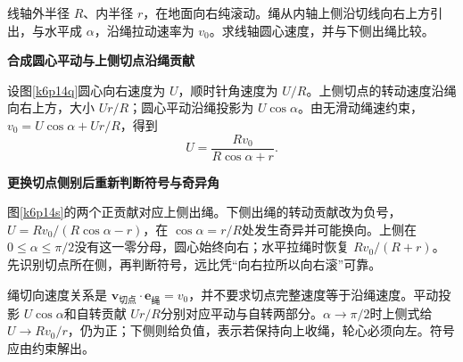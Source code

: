 \begin{question}\begin{example}[斜绳牵引上侧出绳线轴]\label{k6p14}
线轴外半径 $R$、内半径 $r$，在地面向右纯滚动。绳从内轴上侧沿切线向右上方引出，与水平成 $\alpha$，沿绳拉动速率为 $v_0$。求线轴圆心速度，并与下侧出绳比较。\end{example}
\end{question}
\begin{solution}\textbf{合成圆心平动与上侧切点沿绳贡献}\par\nobreak
设图\ref{k6p14q}圆心向右速度为 $U$，顺时针角速度为 $U/R$。上侧切点的转动速度沿绳向右上方，大小 $Ur/R$；圆心平动沿绳投影为 $U\cos\alpha$。由无滑动绳速约束，$v_0=U\cos\alpha+Ur/R$，得到
\[\boxed{U=\frac{Rv_0}{R\cos\alpha+r}}.\]



\par\medskip{}\noindent\textbf{更换切点侧别后重新判断符号与奇异角}\par\nobreak
图\ref{k6p14s}的两个正贡献对应上侧出绳。下侧出绳的转动贡献改为负号，$U=Rv_0/(R\cos\alpha-r)$，在 $\cos\alpha=r/R$处发生奇异并可能换向。上侧在 $0\le\alpha\le\pi/2$没有这一零分母，圆心始终向右；水平拉绳时恢复 $Rv_0/(R+r)$。先识别切点所在侧，再判断符号，远比凭“向右拉所以向右滚”可靠。

绳切向速度关系是 $\bm v_{\text{切点}}\cdot\bm e_{\text{绳}}=v_0$，并不要求切点完整速度等于沿绳速度。平动投影 $U\cos\alpha$和自转贡献 $Ur/R$分别对应平动与自转两部分。$\alpha\to\pi/2$时上侧式给 $U\to Rv_0/r$，仍为正；下侧则给负值，表示若保持向上收绳，轮心必须向左。符号应由约束解出。\end{solution}
